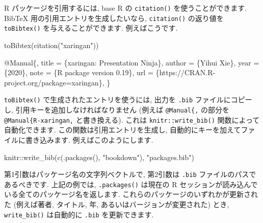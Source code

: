 \documentclass[
  11pt,
]{bxjsreport}
\newenvironment{Shaded}{\begin{snugshade}}{\end{snugshade}}
\newcommand{\DataTypeTok}[1]{\textcolor[rgb]{0.13,0.29,0.53}{#1}}
\newcommand{\FunctionTok}[1]{\textcolor[rgb]{0.00,0.00,0.00}{#1}}
\newcommand{\NormalTok}[1]{#1}
\newcommand{\SpecialCharTok}[1]{\textcolor[rgb]{0.00,0.00,0.00}{#1}}
\newcommand{\StringTok}[1]{\textcolor[rgb]{0.31,0.60,0.02}{#1}}
\newcommand{\VariableTok}[1]{\textcolor[rgb]{0.00,0.00,0.00}{#1}}
\begin{document}
R パッケージを引用するには, base R の \texttt{citation()} を使うことができます. BibTeX 用の引用エントリを生成したいなら, \texttt{citation()} の返り値を \texttt{toBibtex()} を与えることができます. 例えばこうです.

\begin{Shaded}
\begin{Highlighting}[numbers=left,,]
\FunctionTok{toBibtex}\NormalTok{(}\FunctionTok{citation}\NormalTok{(}\StringTok{"xaringan"}\NormalTok{))}
\end{Highlighting}
\end{Shaded}

\begin{Shaded}
\begin{Highlighting}[]
\VariableTok{@Manual}\NormalTok{\{,}
  \DataTypeTok{title}\NormalTok{ = \{xaringan: Presentation Ninja\},}
  \DataTypeTok{author}\NormalTok{ = \{Yihui Xie\},}
  \DataTypeTok{year}\NormalTok{ = \{2020\},}
  \DataTypeTok{note}\NormalTok{ = \{R package version 0.19\},}
  \DataTypeTok{url}\NormalTok{ = \{https://CRAN.R{-}project.org/package=xaringan\},}
\NormalTok{\}}
\end{Highlighting}
\end{Shaded}

\texttt{toBibtex()} で生成されたエントリを使うには, 出力を \texttt{.bib} ファイルにコピーし, 引用キーを追加しなければなりません (例えば \texttt{@Manual\{,} の部分を \texttt{@Manual\{R-xaringan,} と書き換える). これは \texttt{knitr::write\_bib()} 関数によって自動化できます. この関数は引用エントリを生成し, 自動的にキーを加えてファイルに書き込みます. 例えばこのようにします.

\begin{Shaded}
\begin{Highlighting}[numbers=left,,]
\NormalTok{knitr}\SpecialCharTok{::}\FunctionTok{write\_bib}\NormalTok{(}\FunctionTok{c}\NormalTok{(}\FunctionTok{.packages}\NormalTok{(), }\StringTok{"bookdown"}\NormalTok{), }\StringTok{"packages.bib"}\NormalTok{)}
\end{Highlighting}
\end{Shaded}

第1引数はパッケージ名の文字列ベクトルで, 第2引数は \texttt{.bib} ファイルのパスであるべきです. 上記の例では, \texttt{.packages()} は現在の R セッションが読み込んでいる全てのパッケージ名を返します. これらのパッケージのいずれかが更新された (例えば著者, タイトル, 年, あるいはバージョンが変更された) とき, \texttt{write\_bib()} は自動的に \texttt{.bib} を更新できます.
\end{document}
